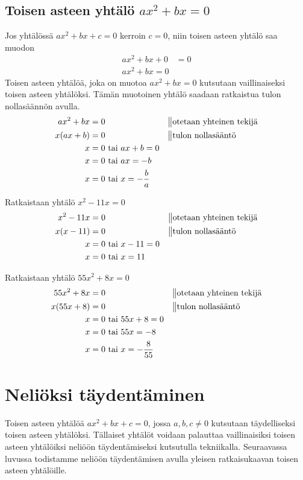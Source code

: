 \subsection*{Toisen asteen yhtälö $ax^2+bx=0$}
Jos yhtälössä $ax^2+bx+c=0$ kerroin $c=0$, niin toisen asteen yhtälö saa muodon
\begin{align*}
ax^2+bx+0&=0 \\
ax^2+bx=0
\end{align*}
Toisen asteen yhtälöä, joka on muotoa $ax^2+bx=0$ kutsutaan vaillinaiseksi toisen asteen yhtälöksi. Tämän muotoinen yhtälö saadaan ratkaistua tulon nollasäännön avulla. \\
\begin{align*}
ax^2+bx&=0 \ \ \ \ \ &&\big\|\text{otetaan yhteinen tekijä} \\
x(ax+b)&=0 \ \ \ \ \ &&\big\|\text{tulon nollasääntö} \\
x&=0 \text{ tai } ax+b=0 \\
x&=0 \text{ tai } ax=-b \\
x&=0 \text{ tai } x=-\frac{b}{a}
\end{align*}
\begin{esimerkki}
Ratkaistaan yhtälö $x^2-11x=0$
\begin{align*}
x^2-11x&=0 \ \ \ \ \  &&\big\|\text{otetaan yhteinen tekijä} \\
x(x-11)&=0 \ \ \ \ \ &&\big\|\text{tulon nollasääntö} \\
x&=0 \text{ tai } x-11=0 \\
x&=0 \text{ tai } x=11
\end{align*}
\end{esimerkki}

\begin{esimerkki}
Ratkaistaan yhtälö $55x^2+8x=0$
\begin{align*}
55x^2+8x&=0 \ \ \ \ \ &&\big\|\text{otetaan yhteinen tekijä} \\
x(55x+8)&=0 \ \ \ \ \ &&\big\|\text{tulon nollasääntö} \\
x&=0 \text{ tai } 55x+8=0 \\
x&=0 \text{ tai } 55x=-8 \\
x&=0 \text{ tai } x=-\frac{8}{55}
\end{align*}
\end{esimerkki}

\section{Neliöksi täydentäminen}
Toisen asteen yhtälöä $ax^2+bx+c=0$, jossa $a,b,c \neq 0$ kutsutaan
täydelliseksi toisen asteen yhtälöksi. Tällaiset yhtälöt voidaan palauttaa
vaillinaisiksi toisen asteen yhtälöiksi neliöön täydentämiseksi kutsutulla
tekniikalla. Seuraavassa luvussa todistamme neliöön täydentämisen avulla
yleisen ratkaisukaavan toisen asteen yhtälöille.

